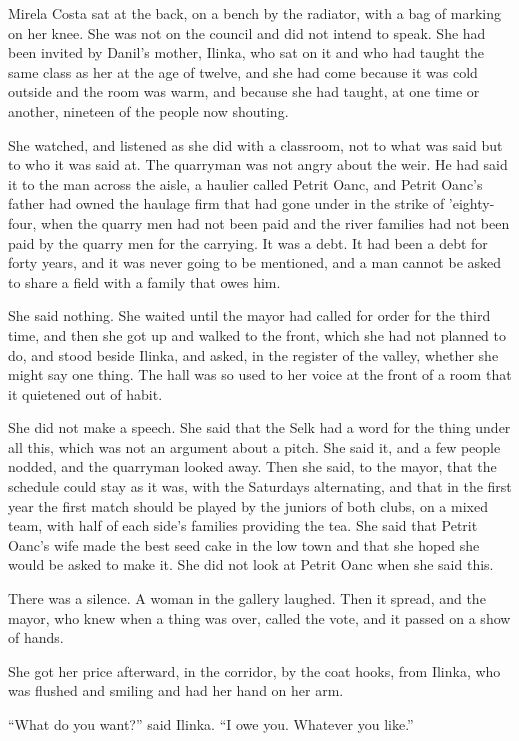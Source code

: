 Mirela Costa sat at the back, on a bench by the radiator, with a bag of marking on her knee. She was not on the council and did not intend to speak. She had been invited by Danil's mother, Ilinka, who sat on it and who had taught the same class as her at the age of twelve, and she had come because it was cold outside and the room was warm, and because she had taught, at one time or another, nineteen of the people now shouting.

She watched, and listened as she did with a classroom, not to what was said but to who it was said at. The quarryman was not angry about the weir. He had said it to the man across the aisle, a haulier called Petrit Oanc, and Petrit Oanc's father had owned the haulage firm that had gone under in the strike of 'eighty-four, when the quarry men had not been paid and the river families had not been paid by the quarry men for the carrying. It was a debt. It had been a debt for forty years, and it was never going to be mentioned, and a man cannot be asked to share a field with a family that owes him.

She said nothing. She waited until the mayor had called for order for the third time, and then she got up and walked to the front, which she had not planned to do, and stood beside Ilinka, and asked, in the register of the valley, whether she might say one thing. The hall was so used to her voice at the front of a room that it quietened out of habit.

She did not make a speech. She said that the Selk had a word for the thing under all this, which was not an argument about a pitch. She said it, and a few people nodded, and the quarryman looked away. Then she said, to the mayor, that the schedule could stay as it was, with the Saturdays alternating, and that in the first year the first match should be played by the juniors of both clubs, on a mixed team, with half of each side's families providing the tea. She said that Petrit Oanc's wife made the best seed cake in the low town and that she hoped she would be asked to make it. She did not look at Petrit Oanc when she said this.

There was a silence. A woman in the gallery laughed. Then it spread, and the mayor, who knew when a thing was over, called the vote, and it passed on a show of hands.

She got her price afterward, in the corridor, by the coat hooks, from Ilinka, who was flushed and smiling and had her hand on her arm.

``What do you want?'' said Ilinka. ``I owe you. Whatever you like.''

